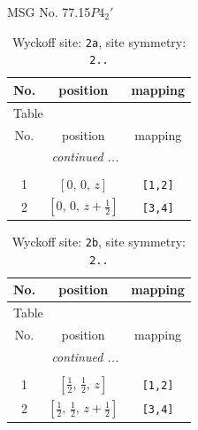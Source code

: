 \documentclass[fleqn,8pt]{jsarticle}
\begin{document}
\setcounter{MaxMatrixCols}{32}

\renewcommand{\tablename}{Table~}
\renewcommand{\figurename}{Figure~}
\begin{center}
\LARGE
MSG No. 77.15\quad$P4_{2}'$
\end{center}
\renewcommand{\arraystretch}{1.2}
\begin{longtable}{ccc}
\caption{Wyckoff site: {\tt 2a}, site symmetry: {\tt 2..}}
 \\
 \hline \hline
No. & position & mapping \\ \hline \endfirsthead

\multicolumn{2}{l}{\tablename\ \thetable{}} \\
 \hline \hline
No. & position & mapping \\ \hline \endhead

 \hline \hline
\multicolumn{2}{r}{\footnotesize\it continued ...} \\ \endfoot

 \hline \hline
\multicolumn{2}{r}{} \\ \endlastfoot

1 & $\left[ 0,\, 0,\, z \right]$ & {\tt [1,2]} \\ \hline
2 & $\left[ 0,\, 0,\, z + \frac{1}{2} \right]$ & {\tt [3,4]} \\
\end{longtable}
\renewcommand{\arraystretch}{1.2}
\begin{longtable}{ccc}
\caption{Wyckoff site: {\tt 2b}, site symmetry: {\tt 2..}}
 \\
 \hline \hline
No. & position & mapping \\ \hline \endfirsthead

\multicolumn{2}{l}{\tablename\ \thetable{}} \\
 \hline \hline
No. & position & mapping \\ \hline \endhead

 \hline \hline
\multicolumn{2}{r}{\footnotesize\it continued ...} \\ \endfoot

 \hline \hline
\multicolumn{2}{r}{} \\ \endlastfoot

1 & $\left[ \frac{1}{2},\, \frac{1}{2},\, z \right]$ & {\tt [1,2]} \\ \hline
2 & $\left[ \frac{1}{2},\, \frac{1}{2},\, z + \frac{1}{2} \right]$ & {\tt [3,4]} \\
\end{longtable}
\renewcommand{\arraystretch}{1.2}
\end{document}
